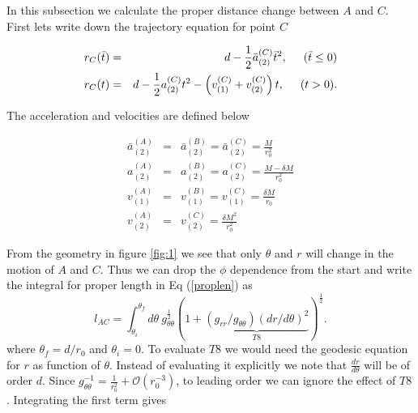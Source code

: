 \documentclass[aps,showpacs,onecolumn,floats,prd,superscriptaddress,nofootinbib]{revtex4-1}
\begin{document}
In this subsection we calculate the proper distance change between $A$ and $C$. First lets write down the trajectory equation for point $C$


\begin{eqnarray}
	r_{C}(\bar{t})  & = & d - \frac{1}{2} \bar{a}_{(2)}^{(C)}  \bar{t}^2 ,  \hspace{5mm} (\bar{t} \leq 0 )		\nonumber	\\
	r_{C}(t) & = &  d - \frac{1}{2} a_{(2)}^{(C)} t^2 - \left(v^{(C)}_{(1)} + v^{(C)}_{(2)} \right) t,  \hspace{5mm} (t >0) . 
\end{eqnarray}

The acceleration and velocities are defined below

\begin{eqnarray}
	\bar{a}^{(A)}_{(2)} & = & \bar{a}^{(B)}_{(2)} = \bar{a}^{(C)}_{(2)} = \frac{M}{r_0^2}	\nonumber	\\
	a^{(A)}_{(2)} & = & a^{(B)}_{(2)} = a^{(C)}_{(2)} = \frac{M - \delta M}{r_0^2}	\nonumber	\\
	v^{(A)}_{(1)} & = & v^{(B)}_{(1)} = v^{(C)}_{(1)}  =  \frac{\delta M}{r_0} 	\nonumber	\\
	v^{(A)}_{(2)} & = & v^{(C)}_{(2)} =  \frac{\delta M^2}{r_0^2}		
\end{eqnarray}

From the geometry in figure \ref{fig:1} we see that only $\theta$ and $r$ will change in the motion of $A$ and $C$. Thus we can drop the $\phi$ dependence from the start and write the integral for proper length in Eq (\ref{proplen}) as
\begin{equation}
	 l_{AC} = \int^{\theta_f}_{\theta_i} d \theta \ g_{\theta \theta}^\frac{1}{2} \left(  1 + \underbrace{(g_{rr}/g_{\theta \theta}) (dr/d\theta)^2}_{T8}  \right)^\frac{1}{2}.
\end{equation}
where $\theta_f = d/r_0$ and $\theta_i = 0$. To evaluate $T8$ we would need the geodesic equation for $r$ as function of $\theta$. Instead of evaluating it explicitly we note that $\frac{dr}{d \theta}$ will be of order $d$. Since $g_{\theta \theta}^{-1} = \frac{1}{r_0^2} + \mathcal{O}(r_0^{-3})$, to leading order we can ignore the effect of $T8$. Integrating the first term gives
\end{document}
